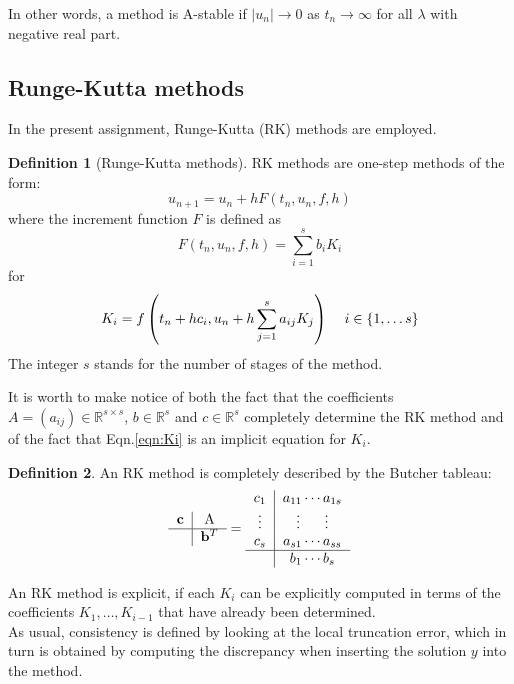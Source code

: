 \documentclass[11pt]{article}
\theoremstyle{theorem}
\theoremstyle{definition}
\newtheorem{definition}{Definition}
\begin{document}
In other words, a method is A-stable if $|u_n|\rightarrow 0$ as $t_n\rightarrow\infty$ for all $\lambda$ with negative real part.\\

\subsection{Runge-Kutta methods}
In the present assignment, Runge-Kutta (RK) methods are employed.\\
\begin{definition}[Runge-Kutta methods]
	\label{def:RK}
	RK methods are one-step methods of the form:
	$$u_{n+1}=u_n + hF(t_n, u_n, f, h)$$
	where the increment function $F$ is defined as
	$$F(t_n, u_n, f, h)=\sum_{i=1}^{s}b_iK_i$$
	for
	\begin{align}
		\label{eqn:Ki}
		K_i=f\left(t_n + hc_i, u_n + h\sum_{j=1}^{s}a_{ij}K_j\right)\hspace{4mm}i\in\lbrace1,\dots s\rbrace
	\end{align}
	The integer $s$ stands for the number of stages of the method.\\
\end{definition}

It is worth to make notice of both the fact that the coefficients $A=(a_{ij})\in\mathbb{R}^{s\times s}$, $b\in\mathbb{R}^s$ and $c\in\mathbb{R}^s$ completely determine the RK method and of the fact that Eqn.\eqref{eqn:Ki} is an implicit equation for $K_i$.\\
\begin{definition}
	\label{def:Butcher-tableau}
	An RK method is completely described by the Butcher tableau:\\
		\begin{align*}
			\begin{tabular}{c|c}
			$\mathbf{c}$ & A  \\
			\hline
			& $\mathbf{b}^T$ \\
			\end{tabular}
			=
			\begin{tabular}{c|c}
			$c_1$ & $a_{11}\cdots a_{1s}$  \\
			$\vdots$ & \vdots\hspace{5mm} \vdots \\
			$c_s$ & $a_{s1}\cdots a_{ss}$ \\
			\hline
			& $b_1\cdots b_s$ \\
			\end{tabular}
		\end{align*}
	
\end{definition}
An RK method is explicit, if each $K_i$ can be explicitly computed in terms of the coefficients $K_1,\dots ,K_{i-1}$ that have already been determined.\\
As usual, consistency is defined by looking at the local truncation error, which in turn
is obtained by computing the discrepancy when inserting the solution $y$ into the method.\\
\end{document}
